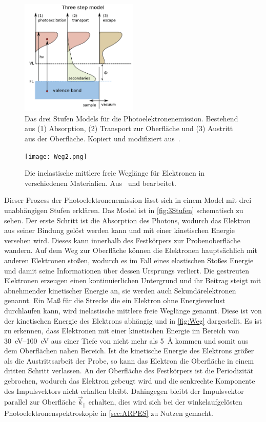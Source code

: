         \begin{figure}
            \centering
            \includegraphics[width=0.5\textwidth]{3Stufen}
            \caption{Das drei Stufen Models für die Photoelektronenemission.
            Bestehend aus (1) Absorption, (2) Transport zur Oberfläche und (3) Austritt aus der Oberfläche.
            Kopiert und modifiziert aus~\cite{zhang_synchrotron_2018}.}
            \label{fig:3Stufen}
        \end{figure}
        \begin{figure}
            \centering
            \texttt{[image: Weg2.png]}
            \caption{Die inelastische mittlere freie Weglänge für Elektronen in verschiedenen Materialien. Aus~\cite{Hüfner} und bearbeitet.}
            \label{fig:Weg}
        \end{figure}
        Dieser Prozess der Photoelektronenemission lässt sich in einem Model mit drei unabhängigen Stufen erklären.
        Das Model ist in \autoref{fig:3Stufen} schematisch zu sehen.
        Der erste Schritt ist die Absorption des Photons, wodurch das Elektron aus seiner Bindung gelöst werden kann und mit einer kinetischen Energie versehen wird.
        Dieses kann innerhalb des Festkörpers zur Probenoberfläche wandern.
        Auf dem Weg zur Oberfläche können die  Elektronen hauptsächlich mit anderen Elektronen stoßen, wodurch es im Fall eines elastischen Stoßes Energie und damit seine Informationen über dessen Ursprungs verliert.
        Die gestreuten Elektronen erzeugen einen kontinuierlichen Untergrund und ihr Beitrag steigt mit abnehmender kinetischer Energie an, sie werden auch Sekundärelektronen genannt.
        Ein Maß für die Strecke die ein Elektron ohne Energieverlust durchlaufen kann, wird inelastische mittlere freie Weglänge genannt.
        Diese ist von der kinetischen Energie des Elektrons abhängig und in \autoref{fig:Weg} dargestellt.
        Es ist zu erkennen, dass Elektronen mit einer kinetischen Energie im Bereich von \SIrange{30}{100}{\electronvolt} aus einer Tiefe von nicht mehr als \SI{5}{\angstrom} kommen und somit aus dem Oberflächen nahen Bereich.
        Ist die kinetische Energie des Elektrons größer als die Austrittsarbeit der Probe, so kann das Elektron die Oberfläche in einem dritten Schritt verlassen.
        An der Oberfläche des Festkörpers ist die Periodizität gebrochen, wodurch das Elektron gebeugt wird und die senkrechte Komponente des Impulsvektors nicht erhalten bleibt.
        Dahingegen bleibt der Impulsvektor parallel zur Oberfläche $\vec{k}_{||}$ erhalten, dies wird sich bei der winkelaufgelösten Photoelektronenspektroskopie in \autoref{sec:ARPES} zu Nutzen gemacht.


